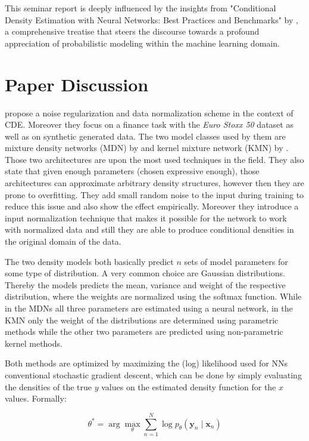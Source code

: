 \documentclass{article}
\begin{document}
This seminar report is deeply influenced by the insights from "Conditional Density Estimation with Neural Networks: Best Practices and Benchmarks" by \citep{rothfuss2019conditional}, a comprehensive treatise that steers the discourse towards a profound appreciation of probabilistic modeling within the machine learning domain.

\section{Paper Discussion}
\citep{rothfuss2019conditional} propose a noise regularization and data normalization scheme in the context of CDE. Moreover they focus on a finance task with the \textit{Euro Stoxx 50} dataset as well as on synthetic generated data. The two model classes used by them are mixture density networks (MDN) by \citep{bishop1994mixture} and kernel mixture network (KMN) by \citep{ambrogioni2017kernel}. Those two architectures are upon the most used techniques in the field. They also state that given enough parameters (chosen expressive enough), those architectures can approximate arbitrary density structures, however then they are prone to overfitting. They add small random noise to the input during training to reduce this issue and also show the effect empirically. Moreover they introduce a input normalization technique that makes it possible for the network to work with normalized data and still they are able to produce conditional densities in the original domain of the data.

The two density models both basically predict $n$ sets of model parameters for some type of distribution. A very common choice are Gaussian distributions. Thereby the models predicts the mean, variance and weight of the respective distribution, where the weights are normalized using the softmax function. While in the MDNs all three parameters are estimated using a neural network, in the KMN only the weight of the distributions are determined using parametric methods while the other two parameters are predicted using non-parametric kernel methods.

Both methods are optimized by maximizing the (log) likelihood used for NNs conventional stochastic gradient descent, which can be done by simply evaluating the densities of the true $y$ values on the estimated density function for the $x$ values. Formally:

$$\theta^*=\arg \max _\theta \sum_{n=1}^N \log p_\theta\left(\boldsymbol{y}_n \mid \boldsymbol{x}_n\right)$$
\end{document}
